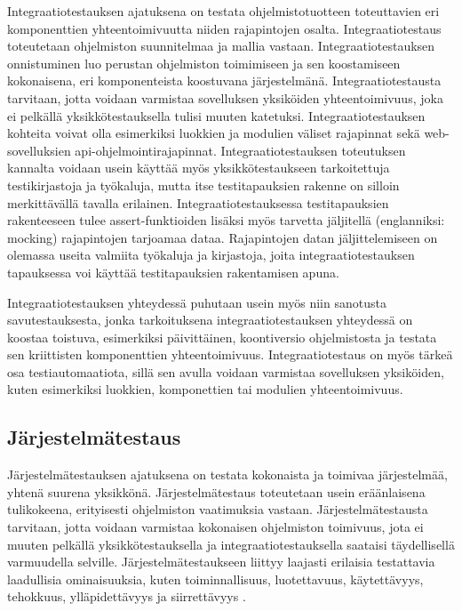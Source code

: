     Integraatiotestauksen ajatuksena on testata ohjelmistotuotteen toteuttavien eri komponenttien yhteentoimivuutta niiden rajapintojen osalta.
    Integraatiotestaus toteutetaan ohjelmiston suunnitelmaa ja mallia vastaan.
    Integraatiotestauksen onnistuminen luo perustan ohjelmiston toimimiseen ja sen  koostamiseen kokonaisena, eri komponenteista koostuvana järjestelmänä.
    Integraatiotestausta tarvitaan, jotta voidaan varmistaa sovelluksen yksiköiden yhteentoimivuus, joka ei pelkällä yksikkötestauksella tulisi muuten katetuksi.
    Integraatiotestauksen kohteita voivat olla esimerkiksi luokkien ja modulien väliset rajapinnat sekä web-sovelluksien api-ohjelmointirajapinnat.
    Integraatiotestauksen toteutuksen kannalta voidaan usein käyttää myös yksikkötestaukseen tarkoitettuja testikirjastoja ja työkaluja, mutta itse testitapauksien rakenne on silloin merkittävällä tavalla erilainen.
    Integraatiotestauksessa testitapauksien rakenteeseen tulee assert-funktioiden lisäksi myös tarvetta jäljitellä (englanniksi: mocking) rajapintojen tarjoamaa dataa.
    Rajapintojen datan jäljittelemiseen on olemassa useita valmiita työkaluja ja kirjastoja, joita integraatiotestauksen tapauksessa voi käyttää testitapauksien rakentamisen apuna.

    Integraatiotestauksen yhteydessä puhutaan usein myös niin sanotusta savutestauksesta, jonka tarkoituksena integraatiotestauksen yhteydessä on koostaa toistuva, esimerkiksi päivittäinen, koontiversio ohjelmistosta ja testata sen kriittisten komponenttien yhteentoimivuus.
    Integraatiotestaus on myös tärkeä osa testiautomaatiota, sillä sen avulla voidaan varmistaa sovelluksen yksiköiden, kuten esimerkiksi luokkien, komponettien tai modulien yhteentoimivuus.

  \subsection{Järjestelmätestaus} \label{ch:07_jarjestelmatestaus}

    Järjestelmätestauksen ajatuksena on testata kokonaista ja toimivaa järjestelmää, yhtenä suurena yksikkönä.
    Järjestelmätestaus toteutetaan usein eräänlaisena tulikokeena, erityisesti ohjelmiston vaatimuksia vastaan.
    Järjestelmätestausta tarvitaan, jotta voidaan varmistaa kokonaisen ohjelmiston toimivuus, jota ei muuten pelkällä yksikkötestauksella ja integraatiotestauksella saataisi täydellisellä varmuudella selville.
    Järjestelmätestaukseen liittyy laajasti erilaisia testattavia laadullisia ominaisuuksia, kuten toiminnallisuus, luotettavuus, käytettävyys, tehokkuus, ylläpidettävyys ja siirrettävyys \parencite{iso_9126-1_2001}.

